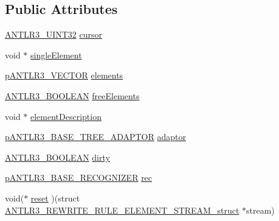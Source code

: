 \subsection*{Public Attributes}
\begin{DoxyCompactItemize}
\item 
\hyperlink{antlr3defs_8h_ac41f744abd0fd25144b9eb9d11b1dfd1}{A\-N\-T\-L\-R3\-\_\-\-U\-I\-N\-T32} \hyperlink{struct_a_n_t_l_r3___r_e_w_r_i_t_e___r_u_l_e___e_l_e_m_e_n_t___s_t_r_e_a_m__struct_a26ee5204e3a6fa6ba468478663a46f60}{cursor}
\item 
void $\ast$ \hyperlink{struct_a_n_t_l_r3___r_e_w_r_i_t_e___r_u_l_e___e_l_e_m_e_n_t___s_t_r_e_a_m__struct_a3d90443fe82f011d5709c84c9add4508}{single\-Element}
\item 
\hyperlink{antlr3interfaces_8h_a0dfeeada7529fbe1b968be84079b828f}{p\-A\-N\-T\-L\-R3\-\_\-\-V\-E\-C\-T\-O\-R} \hyperlink{struct_a_n_t_l_r3___r_e_w_r_i_t_e___r_u_l_e___e_l_e_m_e_n_t___s_t_r_e_a_m__struct_a5f5e056ea19406a056138bb2db3e1396}{elements}
\item 
\hyperlink{antlr3defs_8h_a5b33dccbba3b7212539695e21df4079b}{A\-N\-T\-L\-R3\-\_\-\-B\-O\-O\-L\-E\-A\-N} \hyperlink{struct_a_n_t_l_r3___r_e_w_r_i_t_e___r_u_l_e___e_l_e_m_e_n_t___s_t_r_e_a_m__struct_a00de6f1193fabbd344258e02d7bf6b23}{free\-Elements}
\item 
void $\ast$ \hyperlink{struct_a_n_t_l_r3___r_e_w_r_i_t_e___r_u_l_e___e_l_e_m_e_n_t___s_t_r_e_a_m__struct_a0902e14cb0c4ce49537d9c06176acb8f}{element\-Description}
\item 
\hyperlink{antlr3interfaces_8h_aa6367527a5a2567bdc31c7066fc7000a}{p\-A\-N\-T\-L\-R3\-\_\-\-B\-A\-S\-E\-\_\-\-T\-R\-E\-E\-\_\-\-A\-D\-A\-P\-T\-O\-R} \hyperlink{struct_a_n_t_l_r3___r_e_w_r_i_t_e___r_u_l_e___e_l_e_m_e_n_t___s_t_r_e_a_m__struct_a20b25c06ca3abdbfba72f112142b9833}{adaptor}
\item 
\hyperlink{antlr3defs_8h_a5b33dccbba3b7212539695e21df4079b}{A\-N\-T\-L\-R3\-\_\-\-B\-O\-O\-L\-E\-A\-N} \hyperlink{struct_a_n_t_l_r3___r_e_w_r_i_t_e___r_u_l_e___e_l_e_m_e_n_t___s_t_r_e_a_m__struct_ace76c26ae005d87209376d9aafae6f35}{dirty}
\item 
\hyperlink{group___a_n_t_l_r3___b_a_s_e___r_e_c_o_g_n_i_z_e_r_ga5aeeb8dcbf65f45605ae07cbd618e24c}{p\-A\-N\-T\-L\-R3\-\_\-\-B\-A\-S\-E\-\_\-\-R\-E\-C\-O\-G\-N\-I\-Z\-E\-R} \hyperlink{struct_a_n_t_l_r3___r_e_w_r_i_t_e___r_u_l_e___e_l_e_m_e_n_t___s_t_r_e_a_m__struct_a98e2e50ecddd94ce2b452514627e2b77}{rec}
\item 
void($\ast$ \hyperlink{struct_a_n_t_l_r3___r_e_w_r_i_t_e___r_u_l_e___e_l_e_m_e_n_t___s_t_r_e_a_m__struct_a49e313e9d59d347925773e99afbf3d6e}{reset} )(struct \hyperlink{struct_a_n_t_l_r3___r_e_w_r_i_t_e___r_u_l_e___e_l_e_m_e_n_t___s_t_r_e_a_m__struct}{A\-N\-T\-L\-R3\-\_\-\-R\-E\-W\-R\-I\-T\-E\-\_\-\-R\-U\-L\-E\-\_\-\-E\-L\-E\-M\-E\-N\-T\-\_\-\-S\-T\-R\-E\-A\-M\-\_\-struct} $\ast$stream)

\end{DoxyCompactItemize}
